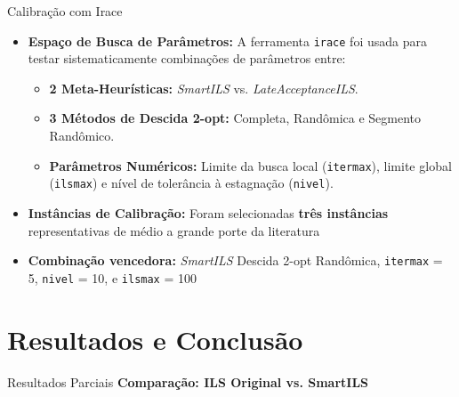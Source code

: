 \documentclass{beamer}
\begin{document}
\begin{frame}{Calibração com Irace}
    \begin{itemize}
        \item \textbf{Espaço de Busca de Parâmetros:} A ferramenta \texttt{irace} \cite{lopez2016irace} foi usada para testar sistematicamente combinações de parâmetros entre:
        \begin{itemize}
            \item \textbf{2 Meta-Heurísticas:} \textit{SmartILS} vs. \textit{LateAcceptanceILS}.
            \item \textbf{3 Métodos de Descida 2-opt:} Completa, Randômica e Segmento Randômico.
            \item \textbf{Parâmetros Numéricos:} Limite da busca local (\texttt{itermax}), limite global (\texttt{ilsmax}) e nível de tolerância à estagnação (\texttt{nivel}).
        \end{itemize}
        \vspace{0.3cm}
        \item \textbf{Instâncias de Calibração:} Foram selecionadas \textbf{três instâncias} representativas de médio a grande porte da literatura
        \vspace{0.3cm}
        \item \textbf{Combinação vencedora:} \textit{SmartILS} Descida 2-opt Randômica, \texttt{itermax} = 5, \texttt{nivel} = 10, e \texttt{ilsmax} = 100
    \end{itemize}
\end{frame}

\section{Resultados e Conclusão}

\begin{frame}{Resultados Parciais}
    \textbf{Comparação: ILS Original vs. SmartILS}
    
    \vspace{0.2cm}
\end{frame}
\end{document}
